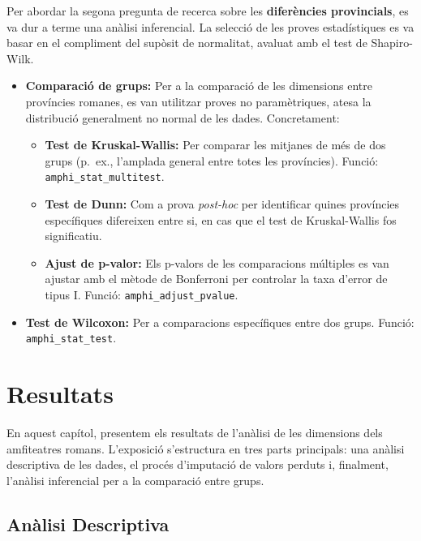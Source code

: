 \documentclass[
  12pt,
  letterpaper,
  DIV=11,
  numbers=noendperiod]{scrreprt}
\providecommand{\tightlist}{%
  \setlength{\itemsep}{0pt}\setlength{\parskip}{0pt}}
\begin{document}
Per abordar la segona pregunta de recerca sobre les \textbf{diferències
provincials}, es va dur a terme una anàlisi inferencial. La selecció de
les proves estadístiques es va basar en el compliment del supòsit de
normalitat, avaluat amb el test de Shapiro-Wilk.

\begin{itemize}
\tightlist
\item
  \textbf{Comparació de grups:} Per a la comparació de les dimensions
  entre províncies romanes, es van utilitzar proves no paramètriques,
  atesa la distribució generalment no normal de les dades. Concretament:

  \begin{itemize}
  \tightlist
  \item
    \textbf{Test de Kruskal-Wallis:} Per comparar les mitjanes de més de
    dos grups (p.~ex., l'amplada general entre totes les províncies).
    Funció: \texttt{amphi\_stat\_multitest}.
  \item
    \textbf{Test de Dunn:} Com a prova \emph{post-hoc} per identificar
    quines províncies específiques difereixen entre si, en cas que el
    test de Kruskal-Wallis fos significatiu.
  \item
    \textbf{Ajust de p-valor:} Els p-valors de les comparacions
    múltiples es van ajustar amb el mètode de Bonferroni per controlar
    la taxa d'error de tipus I. Funció: \texttt{amphi\_adjust\_pvalue}.
  \end{itemize}
\item
  \textbf{Test de Wilcoxon:} Per a comparacions específiques entre dos
  grups. Funció: \texttt{amphi\_stat\_test}.
\end{itemize}


\chapter{Resultats}\label{resultats}

En aquest capítol, presentem els resultats de l'anàlisi de les
dimensions dels amfiteatres romans. L'exposició s'estructura en tres
parts principals: una anàlisi descriptiva de les dades, el procés
d'imputació de valors perduts i, finalment, l'anàlisi inferencial per a
la comparació entre grups.

\section{Anàlisi Descriptiva}\label{anuxe0lisi-descriptiva}
\end{document}
